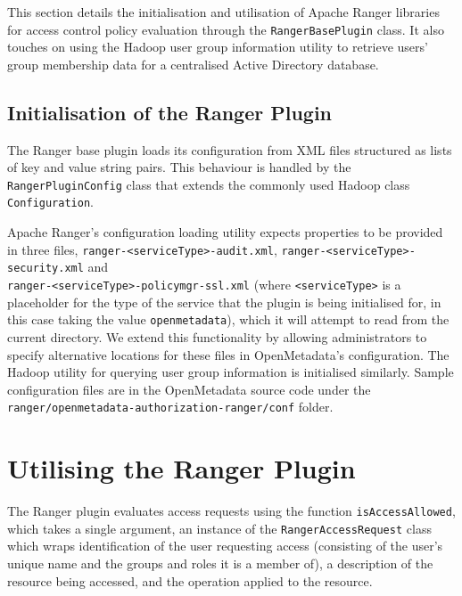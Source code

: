 This section details the initialisation and utilisation of Apache Ranger libraries for access control policy evaluation through the \texttt{RangerBasePlugin} class. It also touches on using the Hadoop user group information utility to retrieve users' group membership data for a centralised Active Directory database.

\subsection{Initialisation of the Ranger Plugin}

The Ranger base plugin loads its configuration from XML files structured as lists of key and value string pairs. This behaviour is handled by the \texttt{RangerPluginConfig} class that extends the commonly used Hadoop class \texttt{Configuration}.

Apache Ranger's configuration loading utility expects properties to be provided in three files, \texttt{ranger-<serviceType>-audit.xml}, \texttt{ranger-<serviceType>-security.xml} and\\ \texttt{ranger-<serviceType>-policymgr-ssl.xml} (where \texttt{<serviceType>} is a placeholder for the type of the service that the plugin is being initialised for, in this case taking the value \texttt{openmetadata}), which it will attempt to read from the current directory. We extend this functionality by allowing administrators to specify alternative locations for these files in OpenMetadata's configuration. The Hadoop utility for querying user group information is initialised similarly. Sample configuration files are in the OpenMetadata source code under the \texttt{ranger/openmetadata-authorization-ranger/conf} folder.

\section{\label{sec:utilising_the_ranger_plugin} Utilising the Ranger Plugin}

The Ranger plugin evaluates access requests using the function \texttt{isAccessAllowed}, which takes a single argument, an instance of the \texttt{RangerAccessRequest} class which wraps identification of the user requesting access (consisting of the user's unique name and the groups and roles it is a member of), a description of the resource being accessed, and the operation applied to the resource. 

